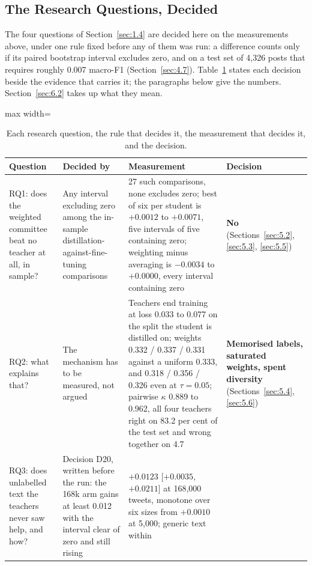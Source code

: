 \subsection{The Research Questions, Decided}
\label{sec:5.12}
The four questions of Section~\ref{sec:1.4} are decided here on the measurements above, under one rule
fixed before any of them was run: a difference counts only if its paired bootstrap interval excludes
zero, and on a test set of 4,326 posts that requires roughly 0.007 macro-F1 (Section~\ref{sec:4.7}).
Table~\ref{tab:rq} states each decision beside the evidence that carries it; the paragraphs below give
the numbers. Section~\ref{sec:6.2} takes up what they mean.

\begin{table}[htbp]
\centering
\footnotesize
\caption[The four research questions and their decisions]{Each research question, the rule that decides
it, the measurement that decides it, and the decision.}
\label{tab:rq}
\begin{adjustbox}{max width=\textwidth}
\begin{tabular}{p{2.0cm}p{3.5cm}p{5.6cm}p{2.3cm}}
\toprule
Question & Decided by & Measurement & Decision \\
\midrule
RQ1: does the weighted committee beat no teacher at all, in sample? & Any interval excluding zero among
the in-sample distillation-against-fine-tuning comparisons & 27 such comparisons, none excludes zero;
best of six per student is $+0.0012$ to $+0.0071$, five intervals of five containing zero; weighting
minus averaging is $-0.0034$ to $+0.0000$, every interval containing zero & \textbf{No}
(Sections~\ref{sec:5.2}, \ref{sec:5.3}, \ref{sec:5.5}) \\
RQ2: what explains that? & The mechanism has to be measured, not argued & Teachers end training at loss
0.033 to 0.077 on the split the student is distilled on; weights 0.332 / 0.337 / 0.331 against a uniform
0.333, and 0.318 / 0.356 / 0.326 even at $\tau = 0.05$; pairwise $\kappa$ 0.889 to 0.962, all four
teachers right on 83.2 per cent of the test set and wrong together on 4.7 & \textbf{Memorised labels,
saturated weights, spent diversity} (Sections~\ref{sec:5.4}, \ref{sec:5.6}) \\
RQ3: does unlabelled text the teachers never saw help, and how? & Decision D20, written before the run:
the 168k arm gains at least 0.012 with the interval clear of zero and still rising & $+0.0123$ [$+0.0035$,
$+0.0211$] at 168,000 tweets, monotone over six sizes from $+0.0010$ at 5,000; generic text within

\end{tabular}
\end{adjustbox}
\end{table}
